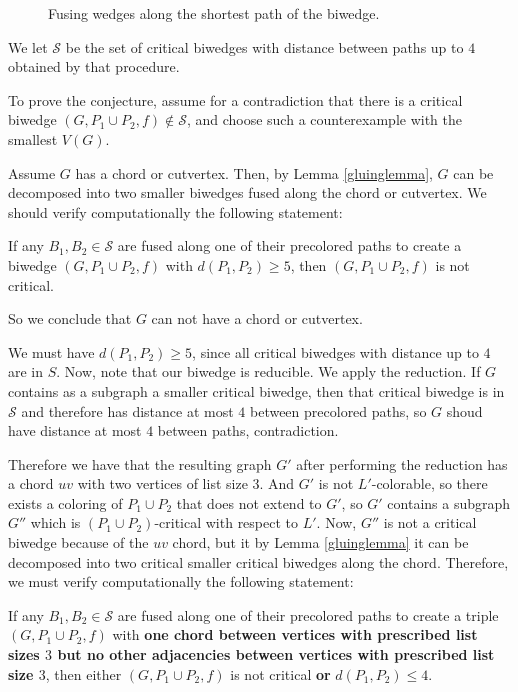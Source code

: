 \begin{figure}
\label{fig:fusingwedges}
\caption{Fusing wedges along the shortest path of the biwedge.}
\end{figure}

We let $\mathcal{S}$ be the set of critical biwedges with distance between paths
up to $4$ obtained by that procedure.

To prove the conjecture, assume for a contradiction that there is a critical biwedge $(G, P_1 \cup P_2,
f) \not\in \mathcal{S}$, and choose such a counterexample with the smallest $V(G)$. 

Assume $G$ has a chord or cutvertex. Then, by Lemma \ref{gluinglemma}, $G$ can be decomposed into
two smaller biwedges fused along the chord or cutvertex. We should verify computationally the following
statement:

\begin{proposition}
If any $B_1, B_2 \in \mathcal{S}$ are fused along one of their precolored paths to create a biwedge
$(G, P_1 \cup P_2, f)$ with $d(P_1, P_2) \geq 5$, then $(G, P_1 \cup P_2, f)$ is not critical.
\end{proposition}

So we conclude that $G$ can not have a chord or cutvertex. 

We must have $d(P_1, P_2) \geq 5$, since all critical biwedges with distance up to $4$ are in $S$.
Now, note that our biwedge is reducible. We apply the reduction. If $G$ contains as a 
subgraph a smaller critical biwedge, then that critical biwedge is in $\mathcal{S}$ 
and therefore has distance
at most $4$ between precolored paths, so $G$ shoud have distance at most $4$ between paths, 
contradiction.

Therefore we have that the resulting graph $G'$ after performing the reduction has a chord $uv$ with
two vertices of list size $3$. And $G'$ is not $L'$-colorable, so there exists a coloring of 
$P_1 \cup P_2$ that does not extend to $G'$, so $G'$ contains a subgraph $G''$ which is 
$(P_1 \cup P_2)$-critical with respect to $L'$. Now, $G''$ is not a critical biwedge
because of the $uv$ chord, but it by Lemma \ref{gluinglemma} it can be decomposed into two
critical smaller critical biwedges along the chord. Therefore, we must verify computationally
the following statement:

\begin{proposition}
If any $B_1, B_2 \in \mathcal{S}$ are fused along one of their precolored paths to create a 
triple $(G, P_1 \cup P_2, f)$
with \textbf{one chord between vertices with prescribed list sizes $3$ but no other adjacencies
between vertices with prescribed list size $3$}, then either $(G, P_1 \cup P_2, f)$ is not critical
\textbf{or} $d(P_1, P_2) \leq 4$. 
\end{proposition}
  
